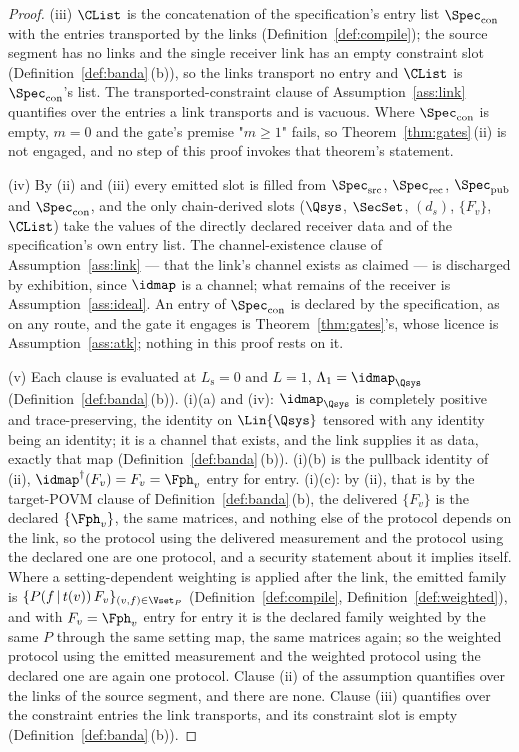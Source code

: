 \begin{proof}
(iii) $\CList$ is the concatenation of the specification's entry list
$\Spec_{\mathrm{con}}$ with the entries transported by the links
(Definition~\ref{def:compile}); the source segment has no links and the
single receiver link has an empty constraint slot
(Definition~\ref{def:banda}\,(b)), so the links transport no entry and
$\CList$ is $\Spec_{\mathrm{con}}$'s list. The transported-constraint clause
of Assumption~\ref{ass:link} quantifies over the entries a link transports
and is vacuous. Where $\Spec_{\mathrm{con}}$ is empty, $m=0$ and the gate's
premise "$m\ge1$" fails, so Theorem~\ref{thm:gates}\,(ii) is not engaged, and
no step of this proof invokes that theorem's statement.

(iv) By (ii) and (iii) every emitted slot is filled from
$\Spec_{\mathrm{src}}$, $\Spec_{\mathrm{rec}}$, $\Spec_{\mathrm{pub}}$ and
$\Spec_{\mathrm{con}}$, and the only chain-derived slots ($\Qsys$, $\SecSet$,
$(d_s)$, $\{F_v\}$, $\CList$) take the values of the directly declared
receiver data and of the specification's own entry list. The
channel-existence clause of Assumption~\ref{ass:link} --- that the link's
channel exists as claimed --- is discharged by exhibition, since $\idmap$ is
a channel; what remains of the receiver is Assumption~\ref{ass:ideal}. An
entry of $\Spec_{\mathrm{con}}$ is declared by the specification, as on any
route, and the gate it engages is Theorem~\ref{thm:gates}'s, whose licence is
Assumption~\ref{ass:atk}; nothing in this proof rests on it.

(v) Each clause is evaluated at $L_{\mathrm s}=0$ and $L=1$,
$\Lambda_1=\idmap_{\Qsys}$ (Definition~\ref{def:banda}\,(b)). (i)(a) and
(iv): $\idmap_{\Qsys}$ is completely positive and trace-preserving, the
identity on $\Lin{\Qsys}$ tensored with any identity being an identity; it is
a channel that exists, and the link supplies it as data, exactly that map
(Definition~\ref{def:banda}\,(b)). (i)(b) is the pullback identity of (ii),
$\idmap^{\dagger}(F_v)=F_v=\Fph_v$ entry for entry. (i)(c): by (ii), that
is by the target-POVM clause of Definition~\ref{def:banda}\,(b), the
delivered $\{F_v\}$ is the declared $\{\Fph_v\}$, the same matrices, and
nothing else of the protocol depends on the link, so the protocol using the
delivered measurement and the protocol using the declared one are one
protocol, and a security statement about it implies itself. Where a
setting-dependent weighting is applied after the link, the emitted family is
$\{P(f\,|\,t(v))\,F_v\}_{(v,f)\in\Vset_P}$ (Definition~\ref{def:compile},
Definition~\ref{def:weighted}), and with $F_v=\Fph_v$ entry for entry it is
the declared family weighted by the same $P$ through the same setting map,
the same matrices again; so the weighted protocol using the emitted
measurement and the weighted protocol using the declared one are again one
protocol. Clause (ii) of
the assumption quantifies over the links of the source segment, and there are
none. Clause (iii) quantifies over the constraint entries the link transports,
and its constraint slot is empty (Definition~\ref{def:banda}\,(b)).
\end{proof}
